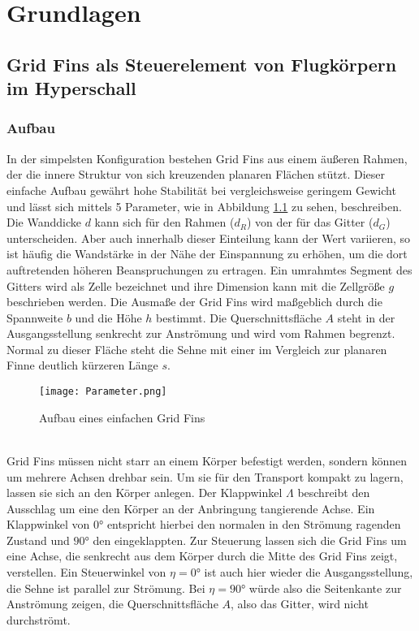 \chapter{Grundlagen}
\label{sec:grundlagen}

\section{Grid Fins als Steuerelement von Flugkörpern im Hyperschall}
\subsection{Aufbau}
In der simpelsten Konfiguration bestehen Grid Fins aus einem äußeren Rahmen, der die innere Struktur von sich kreuzenden planaren Flächen stützt. Dieser einfache Aufbau gewährt hohe Stabilität bei vergleichsweise geringem Gewicht und lässt sich mittels 5 Parameter, wie in Abbildung \ref{abb_parameter} zu sehen, beschreiben. Die Wanddicke $d$ kann sich für den Rahmen ($d_R$) von der für das Gitter ($d_G$) unterscheiden. Aber auch innerhalb dieser Einteilung kann der Wert variieren, so ist häufig die Wandstärke in der Nähe der Einspannung zu erhöhen, um die dort auftretenden höheren Beanspruchungen zu ertragen. Ein umrahmtes Segment des Gitters wird als Zelle bezeichnet und ihre Dimension kann mit die Zellgröße $g$ beschrieben werden. Die Ausmaße der Grid Fins wird maßgeblich durch die Spannweite $b$ und die Höhe $h$ bestimmt. Die Querschnittsfläche $A$ steht in der Ausgangsstellung senkrecht zur Anströmung und wird vom Rahmen begrenzt. Normal zu dieser Fläche steht die Sehne mit einer im Vergleich zur planaren Finne deutlich kürzeren Länge $s$.\\
\begin{figure}[h]
	\centering
	\texttt{[image: Parameter.png]}
	\caption{Aufbau eines einfachen Grid Fins}
	\label{abb_parameter}
\end{figure}\\
Grid Fins müssen nicht starr an einem Körper befestigt werden, sondern können um mehrere Achsen drehbar sein. Um sie für den Transport kompakt zu lagern, lassen sie sich an den Körper anlegen. Der Klappwinkel $\Lambda$ beschreibt den Ausschlag um eine den Körper an der Anbringung tangierende Achse. Ein Klappwinkel von $0°$ entspricht hierbei den normalen in den Strömung ragenden Zustand und $90°$ den eingeklappten. Zur Steuerung lassen sich die Grid Fins um eine Achse, die senkrecht aus dem Körper durch die Mitte des Grid Fins zeigt, verstellen. Ein Steuerwinkel von $\eta = 0°$ ist auch hier wieder die Ausgangsstellung, die Sehne ist parallel zur Strömung. Bei $\eta = 90°$ würde also die Seitenkante zur Anströmung zeigen, die Querschnittsfläche $A$, also das Gitter, wird nicht durchströmt.\\
